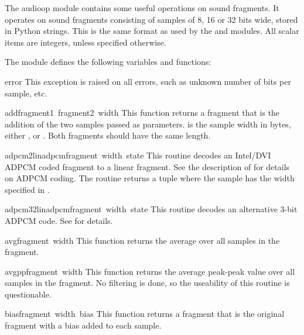 The audioop module contains some useful operations on sound fragments.
It operates on sound fragments consisting of samples of 8, 16 or 32
bits wide, stored in Python strings.  This is the same format as used
by the  and  modules.  All scalar items are
integers, unless specified otherwise.

The module defines the following variables and functions:

\renewcommand{\indexsubitem}{(in module audioop)}
\begin{excdesc}{error}
This exception is raised on all errors, such as unknown number of bits
per sample, etc.
\end{excdesc}

\begin{funcdesc}{add}{fragment1\, fragment2\, width}
This function returns a fragment that is the addition of the two samples
passed as parameters.  is the sample width in bytes, either
,  or . Both fragments should have the same length.
\end{funcdesc}

\begin{funcdesc}{adpcm2lin}{adpcmfragment\, width\, state}
This routine decodes an Intel/DVI ADPCM coded fragment to a linear
fragment. See the description of  for details on ADPCM
coding. The routine returns a tuple
where the sample has the width specified in .
\end{funcdesc}

\begin{funcdesc}{adpcm32lin}{adpcmfragment\, width\, state}
This routine decodes an alternative 3-bit ADPCM code. See
 for details.
\end{funcdesc}

\begin{funcdesc}{avg}{fragment\, width}
This function returns the average over all samples in the fragment.
\end{funcdesc}

\begin{funcdesc}{avgpp}{fragment\, width}
This function returns the average peak-peak value over all samples in
the fragment. No filtering is done, so the useability of this routine
is questionable.
\end{funcdesc}

\begin{funcdesc}{bias}{fragment\, width\, bias}
This function returns a fragment that is the original fragment with a
bias added to each sample.
\end{funcdesc}

